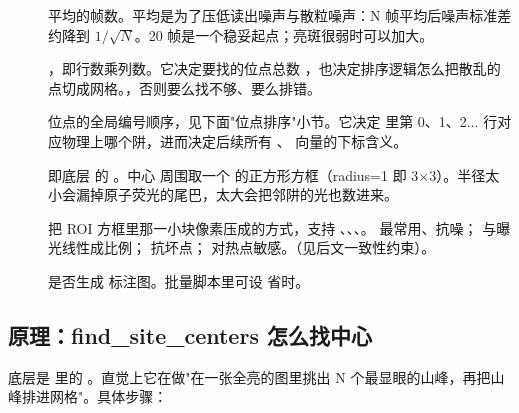 \documentclass[11pt,oneside,openany]{book}
\begin{document}
\begin{description}
\item[] 平均的帧数。平均是为了压低读出噪声与散粒噪声：N 帧平均后噪声标准差约降到 $1/\sqrt{N}$。20 帧是一个稳妥起点；亮斑很弱时可以加大。
\item[] ，即行数乘列数。它决定要找的位点总数 ，也决定排序逻辑怎么把散乱的点切成网格。，否则要么找不够、要么排错。
\item[] 位点的全局编号顺序，见下面"位点排序"小节。它决定  里第 0、1、2... 行对应物理上哪个阱，进而决定后续所有 、 向量的下标含义。
\item[] 即底层  的 。中心  周围取一个  的正方形方框（radius=1 即 3×3）。半径太小会漏掉原子荧光的尾巴，太大会把邻阱的光也数进来。
\item[] 把 ROI 方框里那一小块像素压成的方式，支持 、、、。 最常用、抗噪； 与曝光线性成比例； 抗坏点； 对热点敏感。（见后文一致性约束）。
\item[] 是否生成  标注图。批量脚本里可设  省时。
\end{description}

\subsection{原理：find\_site\_centers 怎么找中心}

底层是  里的 。直觉上它在做"在一张全亮的图里挑出 N 个最显眼的山峰，再把山峰排进网格"。具体步骤：
\end{document}
